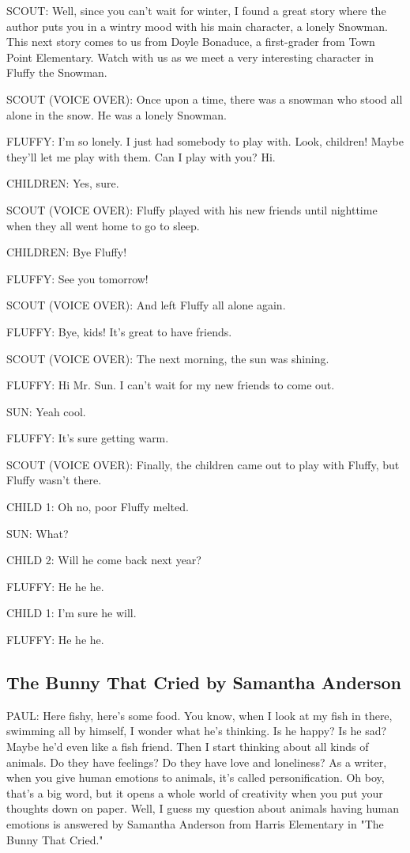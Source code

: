 SCOUT:
Well, since you can't wait for winter, I found a great story where the author puts you in a wintry mood with his main character, a lonely Snowman.
This next story comes to us from Doyle Bonaduce, a first-grader from Town Point Elementary.
Watch with us as we meet a very interesting character in Fluffy the Snowman.

SCOUT (VOICE OVER):
Once upon a time, there was a snowman who stood all alone in the snow.
He was a lonely Snowman.

FLUFFY:
I'm so lonely.
I just had somebody to play with.
Look, children!
Maybe they'll let me play with them.
Can I play with you? Hi.

CHILDREN:
Yes, sure.

SCOUT (VOICE OVER):
Fluffy played with his new friends until nighttime when they all went home to go to sleep.

CHILDREN:
Bye Fluffy!

FLUFFY:
See you tomorrow!

SCOUT (VOICE OVER):
And left Fluffy all alone again.

FLUFFY:
Bye, kids!
It's great to have friends.

SCOUT (VOICE OVER):
The next morning, the sun was shining.

FLUFFY:
Hi Mr. Sun.
I can't wait for my new friends to come out.

SUN:
Yeah cool.

FLUFFY:
It's sure getting warm.

SCOUT (VOICE OVER):
Finally, the children came out to play with Fluffy, but Fluffy wasn't there.

CHILD 1:
Oh no, poor Fluffy melted.

SUN:
What?

CHILD 2:
Will he come back next year?

FLUFFY:
He he he.

CHILD 1:
I'm sure he will.

FLUFFY:
He he he.

\subsection{The Bunny That Cried by Samantha Anderson}

PAUL:
Here fishy, here's some food.
You know, when I look at my fish in there, swimming all by himself, I wonder what he's thinking.
Is he happy?
Is he sad?
Maybe he'd even like a fish friend.
Then I start thinking about all kinds of animals.
Do they have feelings?
Do they have love and loneliness?
As a writer, when you give human emotions to animals, it's called personification.
Oh boy, that's a big word, but it opens a whole world of creativity when you put your thoughts down on paper.
Well, I guess my question about animals having human emotions is answered by Samantha Anderson from Harris Elementary in "The Bunny That Cried."

